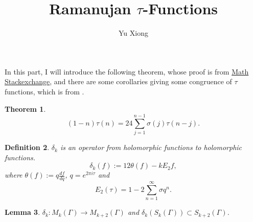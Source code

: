 \documentclass{article}
\newtheorem{theorem}{Theorem}
\newtheorem{definition}[theorem]{Definition}
\newtheorem{lemma}[theorem]{Lemma}
\begin{document}
\title{Ramanujan $\tau$-Functions}
\author{Yu Xiong}
\maketitle
In this part, I will introduce the following theorem, whose proof is from \href{https://math.stackexchange.com/q/84426}{Math Stackexchange}, and there are some corollaries giving some congruence of $\tau$ functions, which is from \cite{MR21951}.
\begin{theorem}\label{Ramanathan}
    \[(1-n)\tau(n)=24\sum_{j=1}^{n-1}\sigma(j)\tau(n-j).\]
\end{theorem}
\begin{definition}
    $\delta_k$ is an operator from holomorphic functions to holomorphic functions. \[\delta_k(f):=12\theta (f)-kE_2f,\] where $\theta(f):=q\frac{df}{dq}$, $q=e^{2\pi i \tau}$ and \[E_2(\tau)=1-2\sum_{n=1}^{\infty}\sigma q^n.\]
\end{definition}
\begin{lemma}
    $\delta_k: M_k(\Gamma)\to M_{k+2}(\Gamma)$ and $\delta_k(S_k(\Gamma))\subset{S_{k+2}(\Gamma)}$.
\end{lemma}
\end{document}
